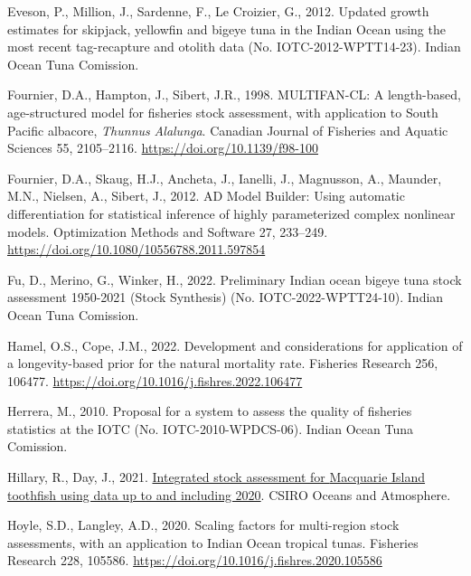 \documentclass[
]{scrartcl}
\newlength{\cslhangindent}
\newenvironment{CSLReferences}[2] %
 {\begin{list}{}{%
  \setlength{\itemindent}{0pt}
  \setlength{\leftmargin}{0pt}
  \setlength{\parsep}{0pt}
  \ifodd #1
   \setlength{\leftmargin}{\cslhangindent}
   \setlength{\itemindent}{-1\cslhangindent}
  \fi
  \setlength{\itemsep}{#2\baselineskip}}}
 {\end{list}}
\begin{document}
\begin{CSLReferences}{1}{0}
Eveson, P., Million, J., Sardenne, F., Le Croizier, G., 2012. Updated
growth estimates for skipjack, yellowfin and bigeye tuna in the {Indian
Ocean} using the most recent tag-recapture and otolith data (No.
IOTC-2012-WPTT14-23). Indian Ocean Tuna Comission.

Fournier, D.A., Hampton, J., Sibert, J.R., 1998. {MULTIFAN-CL}: A
length-based, age-structured model for fisheries stock assessment, with
application to {South Pacific} albacore, {\emph{Thunnus}}{
\emph{Alalunga}}. Canadian Journal of Fisheries and Aquatic Sciences 55,
2105--2116. \url{https://doi.org/10.1139/f98-100}

Fournier, D.A., Skaug, H.J., Ancheta, J., Ianelli, J., Magnusson, A.,
Maunder, M.N., Nielsen, A., Sibert, J., 2012. {AD Model Builder}: Using
automatic differentiation for statistical inference of highly
parameterized complex nonlinear models. Optimization Methods and
Software 27, 233--249.
\url{https://doi.org/10.1080/10556788.2011.597854}

Fu, D., Merino, G., Winker, H., 2022. Preliminary {Indian} ocean bigeye
tuna stock assessment 1950-2021 ({Stock Synthesis}) (No.
IOTC-2022-WPTT24-10). Indian Ocean Tuna Comission.

Hamel, O.S., Cope, J.M., 2022. Development and considerations for
application of a longevity-based prior for the natural mortality rate.
Fisheries Research 256, 106477.
\url{https://doi.org/10.1016/j.fishres.2022.106477}

Herrera, M., 2010. Proposal for a system to assess the quality of
fisheries statistics at the {IOTC} (No. IOTC-2010-WPDCS-06). Indian
Ocean Tuna Comission.

Hillary, R., Day, J., 2021.
\href{https://www.afma.gov.au/sites/default/files/2023-03/2019-0845_final_report\%5B1\%5D.pdf}{Integrated
stock assessment for {Macquarie Island} toothfish using data up to and
including 2020}. {CSIRO Oceans and Atmosphere}.

Hoyle, S.D., Langley, A.D., 2020. Scaling factors for multi-region stock
assessments, with an application to {Indian Ocean} tropical tunas.
Fisheries Research 228, 105586.
\url{https://doi.org/10.1016/j.fishres.2020.105586}


\end{CSLReferences}
\end{document}
